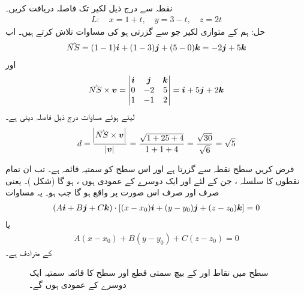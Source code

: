 نقطہ  سے درج ذیل لکیر تک فاصلہ دریافت کریں۔
\begin{align*}
L:\quad x=1+t,\quad y=3-t,\quad z=2t
\end{align*}
حل:\quad
ہم  کے متوازی لکیر   جو  سے گزرتی ہو کی مساوات تلاش کرتے ہیں۔  اب
\begin{align*}
\krightharpoonup{NS}=(1-1)\ai+(1-3)\aj+(5-0)\ak=-2\aj+5\ak
\end{align*}
اور
\begin{align*}
\krightharpoonup{NS}\times \kvec{v}=
\begin{vmatrix}
\ai&\aj&\ak\\
0&-2&5\\
1&-1&2
\end{vmatrix}=\ai+5\aj+2\ak
\end{align*}
لیتے ہوئے مساوات  درج ذیل فاصلہ   دیتی ہے۔
\begin{align*}
d=\frac{\abs{\krightharpoonup{NS}\times\kvec{v}}}{\abs{\kvec{v}}}=\frac{\sqrt{1+25+4}}{1+1+4}=\frac{\sqrt{30}}{\sqrt{6}}=\sqrt{5}
\end{align*}

فرض کریں  سطح  نقطہ  سے گزرتا  ہے اور   اس سطح کو سمتیہ  قائمہ ہے۔ تب  ان تمام نقطوں  کا سلسلہ ، جن کے لئے    اور  ایک دوسرے کے عمودی ہوں ،  ہو گا  (شکل )۔ یعنی  صرف اور صرف اس صورت  پر واقع ہو گا جب  ہو۔ یہ مساوات
\begin{align*}
(A{\boldsymbol{i}}+B{\boldsymbol{j}}+C{\boldsymbol{k}})\cdot[(x-x_0){\boldsymbol{i}}+(y-y_0){\boldsymbol{j}}+(z-z_0){\boldsymbol{k}}]=0
\end{align*}
یا
\begin{align*}
A(x-x_0)+B(y-y_0)+C(z-z_0)=0
\end{align*}
کے مترادف ہے۔
\begin{figure}
\centering
{}
\caption{سطح میں نقاط   اور  کے بیچ سمتی قطع اور سطح کا قائمہ سمتیہ  ایک دوسرے کے عمودی ہوں گے۔}
\label{شکل_سمتیہ_فضا_میں_مستوی_کی_معیاری_مساوات}
\end{figure}

